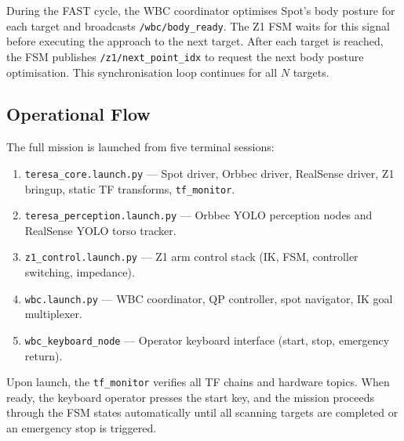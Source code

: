 During the FAST cycle, the WBC coordinator optimises Spot's body posture
for each target and broadcasts \texttt{/wbc/body\_ready}. The Z1
\ac{FSM} waits for this signal before executing the approach to the next
target. After each target is reached, the \ac{FSM} publishes
\texttt{/z1/next\_point\_idx} to request the next body posture
optimisation. This synchronisation loop continues for all $N$ targets.

\subsection{Operational Flow}

The full mission is launched from five terminal sessions:
\begin{enumerate}
  \item \texttt{teresa\_core.launch.py} --- Spot driver, Orbbec driver,
        RealSense driver, Z1 bringup, static \ac{TF} transforms,
        \texttt{tf\_monitor}.
  \item \texttt{teresa\_perception.launch.py} --- Orbbec YOLO perception
        nodes and RealSense YOLO torso tracker.
  \item \texttt{z1\_control.launch.py} --- Z1 arm control stack
        (\ac{IK}, \ac{FSM}, controller switching, impedance).
  \item \texttt{wbc.launch.py} --- WBC coordinator, \ac{QP} controller,
        spot navigator, \ac{IK} goal multiplexer.
  \item \texttt{wbc\_keyboard\_node} --- Operator keyboard interface
        (start, stop, emergency return).
\end{enumerate}

Upon launch, the \texttt{tf\_monitor} verifies all \ac{TF} chains and
hardware topics. When ready, the keyboard operator presses the start
key, and the mission proceeds through the \ac{FSM} states automatically
until all scanning targets are completed or an emergency stop is
triggered.
